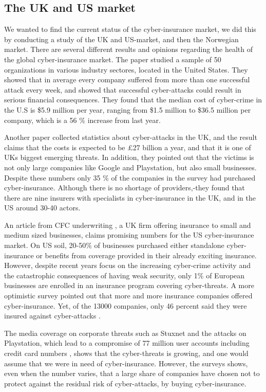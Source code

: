\subsection{The UK and US market}
We wanted to find the current status of the cyber-insurance market, we did this by conducting a study of the UK and US-market, and then the Norwegian market. 
There are several different results and opinions regarding the health of the global cyber-insurance market. 
The paper \cite{ccost} studied a sample of 50 organizations in various industry sectores, located in the United States. They showed that in average every company suffered from more than one successful attack every week, and showed that successful cyber-attacks could result in serious financial consequences. They found that the median cost of cyber-crime in the U.S is \$5.9 million per year, ranging from \$1.5 million to \$36.5 million per company, which is a 56 $\%$ increase from last year. 
 
 Another paper \cite{evolvingcyber} collected statistics about cyber-attacks in the UK, and the result claims that the costs is expected to be \pounds 27 billion a year, and that it is one of UKs biggest emerging threats. In addition, they pointed out that the victims is not only large companies like Google and Playstation, but also small businesses. Despite these numbers only 35 $\%$ of the companies in the survey had purchased cyber-insurance. Although there is no shortage of providers,-they found that there are nine insurers with specialists in cyber-insurance in the UK, and in the US around 30-40 actors.  
 
 
 An article from CFC underwriting \cite{CFCunder}, a UK firm offering insurance to small and medium sized businesses, claims promising numbers for the US cyber-insurance market. On US soil, 20-50$\%$ of businesses purchased either standalone cyber-insurance or benefits from coverage provided in their already exciting insurance. However, despite recent years focus on the increasing cyber-crime activity and the catastrophic consequences of having weak security, only 1$\%$ of European businesses are enrolled in an insurance program covering cyber-threats.
A more optimistic survey pointed out that more and more insurance companies offered cyber-insurance. Yet, of the 13000 companies, only 46 percent said they were insured against cyber-attacks \cite{compworld}. 
 
 The media coverage on corporate threats such as Stuxnet and the attacks on Playstation, which lead to a compromise of 77 million user accounts including credit card numbers \cite{playstation}, shows that the cyber-threats is growing, and one would assume that we were in need of cyber-insurance. However, the surveys shows, even when the number varies, that a large share of companies have chosen not to protect against the residual risk of cyber-attacks, by buying cyber-insurance.

